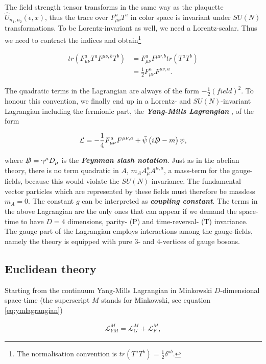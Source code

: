 \documentclass{article}
\theoremstyle{plain} %
\theoremstyle{convention} %
\theoremstyle{remark} %
\def\df#1{\textbf{\textit{#1}}}
\numberwithin{equation}{section}
\begin{document}
The field strength tensor transforms in the same way as the plaquette $\hat{U}_{n_1,n_2}(\epsilon,x)$, thus the trace over $F_{\mu \nu}^a T^a$ in color space is invariant under $SU(N)$ transformations. To be Lorentz-invariant as well, we need a Lorentz-scalar. Thus we need to contract the indices and obtain\footnote{The normalisation convention is $tr(T^a T^b) = \frac{1}{2} \delta^{ab}$.}

\begin{align}
    tr( F_{\mu \nu}^a T^a F^{\mu \nu, b} T^b) &= F_{\mu \nu}^a F^{\mu \nu, b} tr(T^a T^b) \\
    &= \frac{1}{2} F_{\mu \nu}^a F^{\mu \nu, a}.
\end{align}

The quadratic terms in the Lagrangian are always of the form $-\frac{1}{2} (\textit{field})^2$. To honour this convention, we finally end up in a Lorentz- and $SU(N)$-invariant Lagrangian including the fermionic part, the \df{Yang-Mills Lagrangian} \cite{yang1954}, of the form

\begin{align}
    \mathcal{L} = -\frac{1}{4} F_{\mu \nu}^a F^{\mu \nu, a} + \bar{\psi} \left( i \slashed{D} - m \right) \psi, \label{eq:ymlagrangian}
\end{align}

where $\slashed{D} = \gamma^{\mu} D_{\mu}$ is the \df{Feynman slash notation}. Just as in the abelian theory, there is no term quadratic in $A$, $m_A A_{\mu}^a A^{\mu,a}$, a mass-term for the gauge-fields, because this would violate the $SU(N)$-invariance. The fundamental vector particles which are represented by these fields must therefore be massless $m_A = 0$. The constant $g$ can be interpreted as \df{coupling constant}. The terms in the above Lagrangian are the only ones that can appear if we demand the space-time to have $D=4$ dimensions, parity- (P) and time-reversal- (T) invariance. The gauge part of the Lagrangian employs interactions among the gauge-fields, namely the theory is equipped with pure 3- and 4-vertices of gauge bosons.

\subsection{Euclidean theory}

Starting from the continuum Yang-Mills Lagrangian in Minkowski $D$-dimensional space-time (the superscript $M$ stands for Minkowski, see equation \eqref{eq:ymlagrangian})

\begin{align}
    \mathcal{L}_{YM}^M = \mathcal{L}_G^M + \mathcal{L}_F^M, \label{eq:cont_ym_lagrangian}
\end{align}
\end{document}
